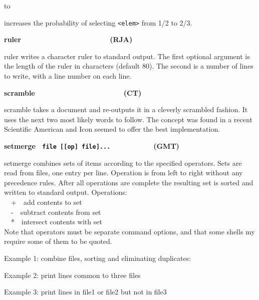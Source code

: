 {to


increases the probability of selecting
\texttt{{\textless}elem{\textgreater}} from 1/2 to 2/3. 

{\sffamily\bfseries
ruler\ \ \ \ \ \ \ \ \ \ \ \ \ \ \ \ \ \ \ \ \ \ (RJA)}

\textsf{ruler} writes a character ruler to standard output. The first
optional argument is the length of the ruler in characters (default
80). The second is a number of lines to write, with a line number on
each line.

{\sffamily\bfseries
scramble\ \ \ \ \ \ \ \ \ \ \ \ \ \ \ \ \ \ \ \  \ \ (CT)}

\textsf{scramble} takes a document and re-outputs it in a cleverly
scrambled fashion. It uses the next two most likely words to follow.
The concept was found in a recent Scientific American and Icon seemed
to offer the best implementation.

{\sffamily\bfseries
setmerge \ \texttt{\textmd{file [[op]
file]...\ \ \ \ \ \ \ \ \ \ \ \ }}(GMT)}

\textsf{setmerge} combines sets of items according to the specified
operators. Sets are read from files, one entry per line. Operation is
from left to right without any precedence rules. After all operations
are complete the resulting set is sorted and written to standard
output. Operations:\\
\ \ +\ \ add contents to set\\
\ \ {}-\ \ subtract contents from set\\
\ \ *\ \ intersect contents with set\\
Note that operators must be separate command options, and that some
shells my require some of them to be quoted.

Example 1: combine files, sorting and eliminating duplicates:


Example 2: print lines common to three files


Example 3: print lines in file1 or file2 but not in file3


}
